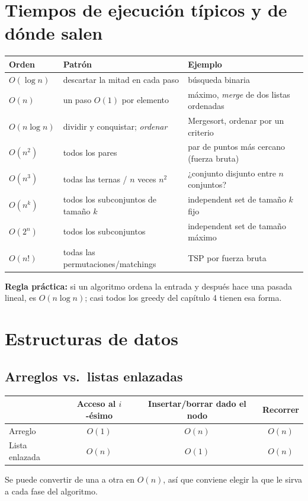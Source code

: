 \documentclass[11pt,a4paper]{article}
\theoremstyle{plain}
\theoremstyle{definition}
\theoremstyle{remark}
\begin{document}
\section{Tiempos de ejecución típicos y de dónde salen}

\begin{center}\small
\begin{tabular}{@{}lll@{}}
\toprule
\textbf{Orden} & \textbf{Patrón} & \textbf{Ejemplo} \\
\midrule
$O(\log n)$   & descartar la mitad en cada paso     & búsqueda binaria \\
$O(n)$        & un paso $O(1)$ por elemento         & máximo, \emph{merge} de dos listas ordenadas \\
$O(n\log n)$  & dividir y conquistar; \emph{ordenar} & Mergesort, ordenar por un criterio \\
$O(n^2)$      & todos los pares                     & par de puntos más cercano (fuerza bruta) \\
$O(n^3)$      & todas las ternas / $n$ veces $n^2$  & ¿conjunto disjunto entre $n$ conjuntos? \\
$O(n^k)$      & todos los subconjuntos de tamaño $k$& independent set de tamaño $k$ fijo \\
$O(2^n)$      & todos los subconjuntos              & independent set de tamaño máximo \\
$O(n!)$       & todas las permutaciones/matchings   & TSP por fuerza bruta \\
\bottomrule
\end{tabular}
\end{center}

\noindent\textbf{Regla práctica:} si un algoritmo ordena la entrada y después hace una
pasada lineal, es $O(n\log n)$; casi todos los greedy del capítulo 4 tienen esa forma.

\section{Estructuras de datos}

\subsection{Arreglos vs.\ listas enlazadas}
\begin{center}\small
\begin{tabular}{@{}lccc@{}}
\toprule
& \textbf{Acceso al $i$-ésimo} & \textbf{Insertar/borrar dado el nodo} & \textbf{Recorrer} \\
\midrule
Arreglo        & $O(1)$ & $O(n)$ & $O(n)$ \\
Lista enlazada & $O(n)$ & $O(1)$ & $O(n)$ \\
\bottomrule
\end{tabular}
\end{center}
Se puede convertir de una a otra en $O(n)$, así que conviene elegir la que le sirva a
cada fase del algoritmo.
\end{document}
